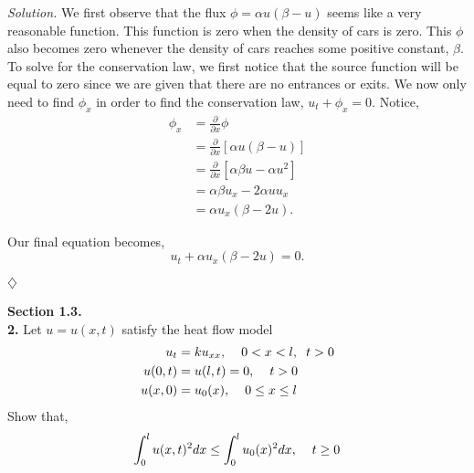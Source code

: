 \documentclass{article}
\begin{document}
\noindent
\textit{Solution.}  We first observe that the flux \(\phi=\alpha u (\beta-u)\) seems like a very reasonable function. This function is zero when the density of cars is zero. This \(\phi\) also becomes zero whenever the density of cars reaches some positive constant, \(\beta\).  To solve for the conservation law, we first notice that the source function will be equal to zero since we are given that there are no entrances or exits. We now only need to find \( \phi_x \) in order to find the conservation law, \(u_t + \phi_x = 0 \). Notice,
\begin{align*}
\phi_x &= \frac{\partial}{\partial x} \phi \\
 &= \frac{\partial}{\partial x}[ \alpha u (\beta-u) ] \\
 &= \frac{\partial}{\partial x}[\alpha \beta u - \alpha u^2] \\
 &= \alpha \beta u_x - 2 \alpha u u_x \\
 &= \alpha u_x (\beta - 2u).
\end{align*}

\noindent
Our final equation becomes,
\[
u_t + \alpha u_x (\beta - 2u) = 0 .
\]
\begin{flushright}
\( \diamondsuit \) 
\end{flushright}


\newpage
\noindent
\textbf{Section 1.3.} 
\\ \textbf{2.} Let \( u=u(x,t) \) satisfy the heat flow model
\begin{align*}
u_t &= ku_{xx},  \hspace{4mm} 0<x<l, \hspace{2mm}t>0 \\
u(0,t) &= u(l,t) = 0, \hspace{4mm} t>0\\
u(x,0)&= u_0(x),  \hspace{4mm} 0\leq x\leq l
\end{align*}
\noindent
Show that,
\[
\int_0^l u(x,t)^2 dx \leq \int_0^l u_0(x)^2 dx , \hspace{4mm}  t\geq 0
\]
\end{document}
